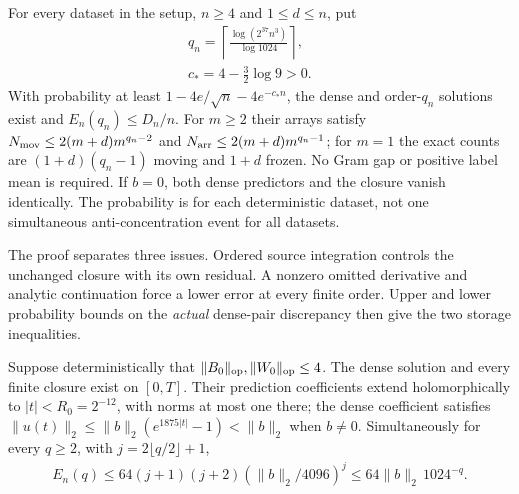 \begin{corollary}\label{cp:nth:general-upper}

For every dataset in the setup, \(n\ge4\) and \(1\le d\le n\), put
\begin{equation}\label{cp:nth:eq:order}{\begin{gathered}
q_n=\left\lceil\frac{\log(2^{37}n^3)}{\log1024}\right\rceil,\qquad\\
c_*=4-\tfrac32\log9>0.
\end{gathered}}\end{equation} With probability at least
\(1-4e/\sqrt n-4e^{-c_*n}\), the dense and order-\(q_n\) solutions exist
and \(E_n(q_n)\le D_n/n\). For \(m\ge2\) their arrays satisfy
\(N_{\rm mov}\le2(m+d)m^{q_n-2}\) and \(N_{\rm arr}\le2(m+d)m^{q_n-1}\);
for \(m=1\) the exact counts are \((1+d)(q_n-1)\) moving and \(1+d\)
frozen. No Gram gap or positive label mean is required. If \(b=0\), both
dense predictors and the closure vanish identically. The probability is
for each deterministic dataset, not one simultaneous anti-concentration
event for all datasets.

\end{corollary}

The proof separates three issues. Ordered source integration controls
the unchanged closure with its own residual. A nonzero omitted
derivative and analytic continuation force a lower error at every finite
order. Upper and lower probability bounds on the \emph{actual}
dense-pair discrepancy then give the two storage inequalities.

\begin{lemma}\label{cp:nth:source-control}

Suppose deterministically that
\(\|B_0\|_{\rm op},\|W_0\|_{\rm op}\le4\). The dense solution and every
finite closure exist on \([0,T]\). Their prediction coefficients extend
holomorphically to \(|t|<R_0=2^{-12}\), with norms at most one there;
the dense coefficient satisfies
\(\|u(t)\|_2\le\|b\|_2(e^{1875|t|}-1)<\|b\|_2\)
when \(b\ne0\). Simultaneously for every \(q\ge2\), with
\(j=2\lfloor q/2\rfloor+1\),
\begin{equation}\label{cp:nth:eq:geometric}{\begin{gathered}
E_n(q)\le64(j+1)(j+2)(\|b\|_2/4096)^j
\le64\|b\|_2\,1024^{-q}.
\end{gathered}}\end{equation}

\end{lemma}

